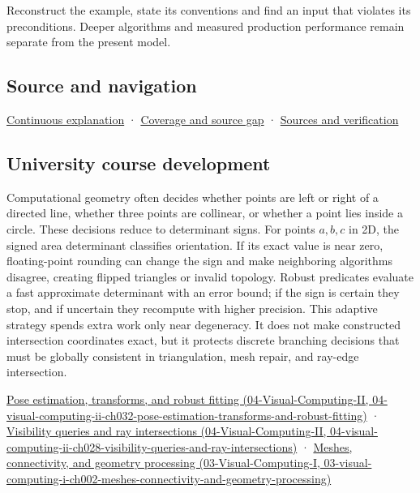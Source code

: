 Reconstruct the example, state its conventions and find an input that violates its preconditions. Deeper algorithms and measured production performance remain separate from the present model.

\subsection{Source and navigation}\label{appendix-da478be01d02-source-and-navigation}

\hyperref[01-foundations-i-ch018-keep-the-promises-visible-while-moving-between-representations]{Continuous explanation} · \hyperref[appendix-fd090d982a15-phase-7---parts-601-700]{Coverage and source gap} · \hyperref[appendix-a103e7846d21-phase-7---source-analysis-and-verification]{Sources and verification}

\subsection{University course development}\label{appendix-da478be01d02-university-course-development}

Computational geometry often decides whether points are left or right of a directed line, whether three points are collinear, or whether a point lies inside a circle. These decisions reduce to determinant signs. For points \(a,b,c\) in 2D, the signed area determinant classifies orientation. If its exact value is near zero, floating-point rounding can change the sign and make neighboring algorithms disagree, creating flipped triangles or invalid topology. Robust predicates evaluate a fast approximate determinant with an error bound; if the sign is certain they stop, and if uncertain they recompute with higher precision. This adaptive strategy spends extra work only near degeneracy. It does not make constructed intersection coordinates exact, but it protects discrete branching decisions that must be globally consistent in triangulation, mesh repair, and ray-edge intersection.

\href{../04-Visual-Computing-II/main.pdf\#nameddest=04-visual-computing-ii-ch032-pose-estimation-transforms-and-robust-fitting}{Pose estimation, transforms, and robust fitting (04-Visual-Computing-II, 04-visual-computing-ii-ch032-pose-estimation-transforms-and-robust-fitting)} · \href{../04-Visual-Computing-II/main.pdf\#nameddest=04-visual-computing-ii-ch028-visibility-queries-and-ray-intersections}{Visibility queries and ray intersections (04-Visual-Computing-II, 04-visual-computing-ii-ch028-visibility-queries-and-ray-intersections)} · \href{../03-Visual-Computing-I/main.pdf\#nameddest=03-visual-computing-i-ch002-meshes-connectivity-and-geometry-processing}{Meshes, connectivity, and geometry processing (03-Visual-Computing-I, 03-visual-computing-i-ch002-meshes-connectivity-and-geometry-processing)}

